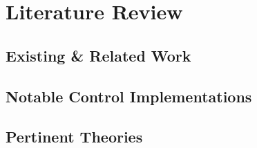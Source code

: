 \chapter{Literature Review}
\label{ch:ch2}
\section{Existing \& Related Work}
\label{sec:ch2.existingwork}
\section{Notable Control Implementations}
\label{sec:ch2.notablecontrol}
\section{Pertinent Theories}
\label{sec:ch2.theories}